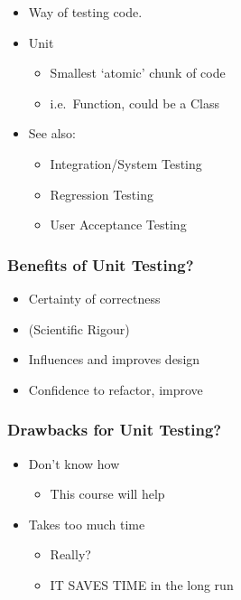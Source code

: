 \begin{itemize}
\itemsep1pt\parskip0pt
\item
  Way of testing code.
\item
  Unit

  \begin{itemize}
  \itemsep1pt\parskip0pt
  \item
    Smallest `atomic' chunk of code
  \item
    i.e.~Function, could be a Class
  \end{itemize}
\item
  See also:

  \begin{itemize}
  \itemsep1pt\parskip0pt
  \item
    Integration/System Testing
  \item
    Regression Testing
  \item
    User Acceptance Testing
  \end{itemize}
\end{itemize}

\subsubsection{Benefits of Unit
Testing?}\label{benefits-of-unit-testing}

\begin{itemize}
\itemsep1pt\parskip0pt
\item
  Certainty of correctness
\item
  (Scientific Rigour)
\item
  Influences and improves design
\item
  Confidence to refactor, improve
\end{itemize}

\subsubsection{Drawbacks for Unit
Testing?}\label{drawbacks-for-unit-testing}

\begin{itemize}
\itemsep1pt\parskip0pt
\item
  Don't know how

  \begin{itemize}
  \itemsep1pt\parskip0pt
  \item
    This course will help
  \end{itemize}
\item
  Takes too much time

  \begin{itemize}
  \itemsep1pt\parskip0pt
  \item
    Really?
  \item
    IT SAVES TIME in the long run
  \end{itemize}
\end{itemize}

